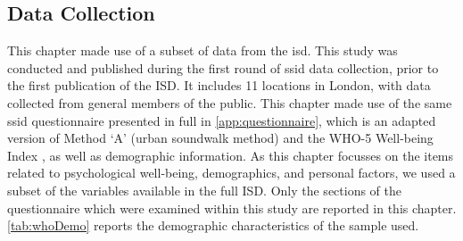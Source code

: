 \subsection{Data Collection}
This chapter made use of a subset of data from the \gls{isd}. This study was conducted and published during the first round of \gls{ssid} data collection, prior to the first publication of the ISD. It includes 11 locations in London, with data collected from general members of the public. This chapter made use of the same \gls{ssid} questionnaire presented in full in \cref{app:questionnaire}, which is an adapted version of \citet{ISO12913Part2} Method `A' (urban soundwalk method) and the WHO-5 Well-being Index \citep{Hall2011Examining}, as well as demographic information. As this chapter focusses on the items related to psychological well-being, demographics, and personal factors, we used a subset of the variables available in the full ISD. Only the sections of the questionnaire which were examined within this study are reported in this chapter. \cref{tab:whoDemo} reports the demographic characteristics of the sample used.


